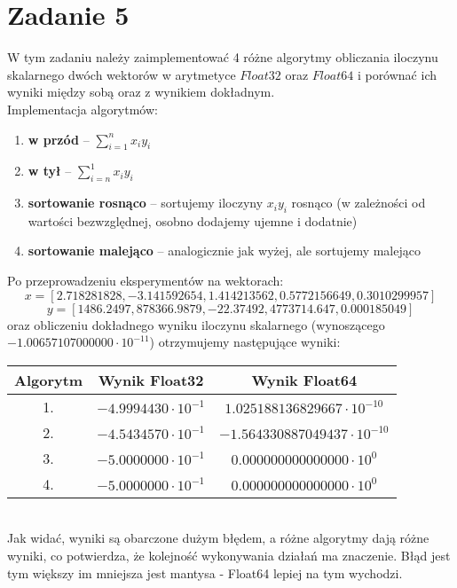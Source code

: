 \documentclass{article}
\begin{document}
\section*{Zadanie 5}
W tym zadaniu należy zaimplementować 4 różne algorytmy obliczania iloczynu skalarnego dwóch wektorów w arytmetyce $Float32$ oraz $Float64$ i porównać ich wyniki między sobą oraz z wynikiem dokładnym.\\
Implementacja algorytmów:
\begin{enumerate}
    \item \textbf{w przód} -- $\sum_{i=1}^{n} x_i y_i$
    \item \textbf{w tył} -- $\sum_{i=n}^{1} x_i y_i$
    \item \textbf{sortowanie rosnąco} -- sortujemy iloczyny $x_i y_i$ rosnąco (w zależności od wartości bezwzględnej, osobno dodajemy ujemne i dodatnie)
    \item \textbf{sortowanie malejąco} -- analogicznie jak wyżej, ale sortujemy malejąco
\end{enumerate}
Po przeprowadzeniu eksperymentów na wektorach:
\[
    x = [2.718281828, -3.141592654, 1.414213562, 0.5772156649, 0.3010299957]
\]
\[
    y = [1486.2497, 878366.9879, -22.37492, 4773714.647, 0.000185049]
\]
oraz obliczeniu dokładnego wyniku iloczynu skalarnego (wynoszącego $-1.00657107000000 \cdot 10^{-11}$) otrzymujemy następujące wyniki:

\begin{table}[h!]
    \centering
    \begin{tabular}{|c|c|c|}
        \hline
        Algorytm & Wynik Float32 & Wynik Float64 \\
        \hline
        1. & $-4.9994430 \cdot 10^{-1}$ & $1.025188136829667 \cdot 10^{-10}$ \\
        \hline
        2. & $-4.5434570 \cdot 10^{-1}$ & $-1.564330887049437 \cdot 10^{-10}$ \\
        \hline
        3. & $-5.0000000 \cdot 10^{-1}$ & $0.000000000000000 \cdot 10^{0}$ \\
        \hline
        4. & $-5.0000000 \cdot 10^{-1}$ & $0.000000000000000 \cdot 10^{0}$ \\
        \hline
    \end{tabular}
    \label{tab:iloczyn}
\end{table}\\
Jak widać, wyniki są obarczone dużym błędem, a różne algorytmy dają różne wyniki, co potwierdza, że kolejność wykonywania działań ma znaczenie. Błąd jest tym większy im mniejsza jest mantysa - Float64 lepiej na tym wychodzi.
\end{document}
